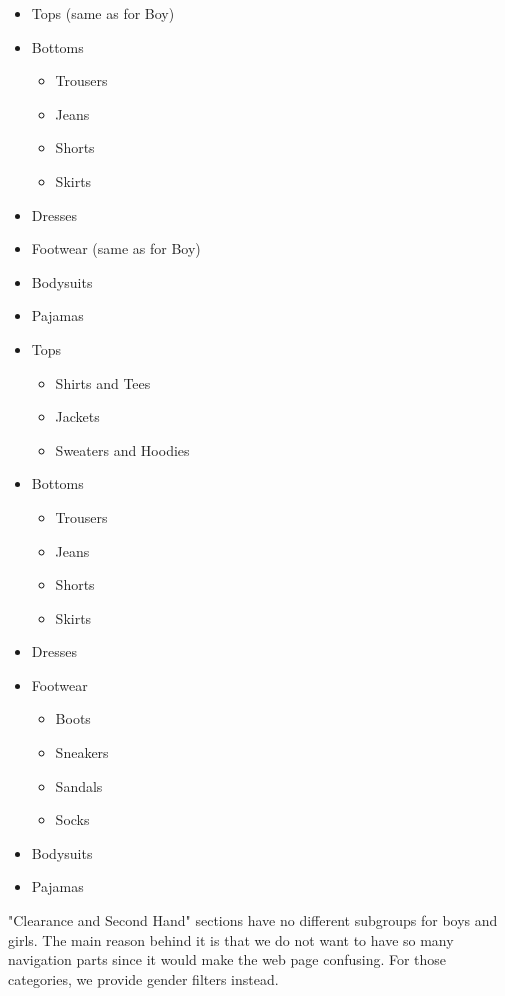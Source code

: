 \begin{itemize}
\setlength{\itemsep}{-3pt}
\setlength{\parskip}{0pt}
\setlength{\parsep}{0pt}

	 \item Tops (same as for Boy)
     \item Bottoms
	 	\begin{itemize}
\setlength{\itemsep}{-3pt}
\setlength{\parskip}{0pt}
\setlength{\parsep}{0pt}
		 \item Trousers
		 \item Jeans
		 \item Shorts
		 \item Skirts
		\end{itemize}
	 \item Dresses
	 \item Footwear (same as for Boy)
	 \item Bodysuits	
     \item Pajamas
	\end{itemize}
\begin{itemize}
\setlength{\itemsep}{-3pt}
\setlength{\parskip}{0pt}
\setlength{\parsep}{0pt}

	 \item Tops
	 	\begin{itemize}
\setlength{\itemsep}{-3pt}
\setlength{\parskip}{0pt}
\setlength{\parsep}{0pt}
		 \item Shirts and Tees
      	 \item Jackets
      	 \item Sweaters and Hoodies
		\end{itemize}
     \item Bottoms
	 	\begin{itemize}
\setlength{\itemsep}{-3pt}
\setlength{\parskip}{0pt}
\setlength{\parsep}{0pt}
		 \item Trousers
		 \item Jeans
		 \item Shorts
		 \item Skirts
		\end{itemize}
	 \item Dresses
	 \item Footwear
	 	\begin{itemize}
\setlength{\itemsep}{-3pt}
\setlength{\parskip}{0pt}
\setlength{\parsep}{0pt}
		 \item Boots
		 \item Sneakers
		 \item Sandals
		 \item Socks
		\end{itemize}
	 \item Bodysuits	
     \item Pajamas
	\end{itemize}
"Clearance and Second Hand" sections have no different subgroups for boys and girls. The main reason behind it is that we do not want to have so many navigation parts since it would make the web page confusing. For those categories, we provide gender filters instead.